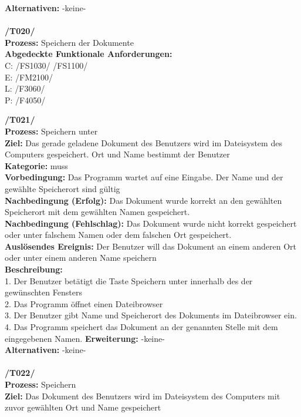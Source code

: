 \documentclass[a4paper]{scrreprt}
\begin{document}
\textbf {Alternativen:} -keine- \\ \\
\textbf{/T020/} \\ 
\textbf{Prozess: }Speichern der Dokumente\\
\textbf{Abgedeckte Funktionale Anforderungen:}\\
C: /FS1030/ /FS1100/\\
E: /FM2100/	\\
L: /F3060/ \\
P: /F4050/\\
\begin{addmargin}[15pt]{0pt}
\textbf{/T021/} \\ 
\textbf{Prozess: }Speichern unter\\
\textbf{Ziel:} Das gerade geladene Dokument des Benutzers wird im Dateisystem des Computers gespeichert. Ort und Name bestimmt der Benutzer\\
\textbf{Kategorie:} muss\\
\textbf{Vorbedingung:} Das Programm wartet auf eine Eingabe. Der Name und der gewählte Speicherort sind gültig\\
\textbf{Nachbedingung (Erfolg):} Das Dokument wurde korrekt an den gewählten Speicherort mit dem gewählten Namen gespeichert.  \\
\textbf{Nachbedingung (Fehlschlag):} Das Dokument wurde nicht korrekt gespeichert oder unter falschem Namen oder dem falschen Ort gespeichert. \\
\textbf{Auslösendes Ereignis:} Der Benutzer will das Dokument an einem anderen Ort oder unter einem anderen Name speichern\\
\textbf{Beschreibung:} \\
1. Der Benutzer betätigt die Taste Speichern unter innerhalb des der gewünschten Fensters\\
2. Das Programm öffnet einen Dateibrowser\\
3. Der Benutzer gibt Name und Speicherort des Dokuments im Dateibrowser ein.
4. Das Programm speichert das Dokument an der genannten Stelle mit dem eingegebenen Namen.
\textbf {Erweiterung:} -keine- \\
\textbf {Alternativen:} -keine- \\ \\
\textbf{/T022/} \\ 
\textbf{Prozess: }Speichern\\
\textbf{Ziel:} Das Dokument des Benutzers wird im Dateisystem des Computers mit zuvor gewählten Ort und Name gespeichert\\

\end{addmargin}
\end{document}
